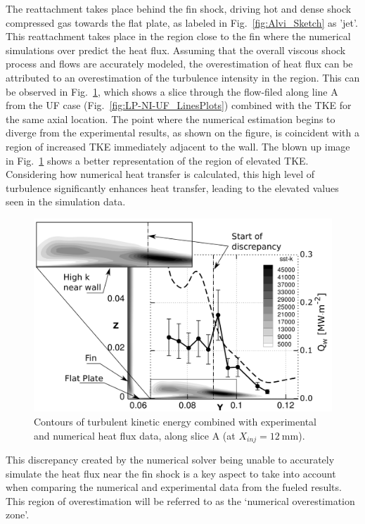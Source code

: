 \documentclass{AIAA}
\begin{document}
The reattachment takes place behind the fin shock, driving hot and dense shock compressed gas towards the flat plate, as labeled in Fig.~\ref{fig:Alvi_Sketch} as 'jet'.
This reattachment takes place in the region close to the fin where the numerical simulations over predict the heat flux.
Assuming that the overall viscous shock process and flows are accurately modeled, the overestimation of heat flux can be attributed to an overestimation of the turbulence intensity in the region.
This can be observed in Fig.~\ref{fig:SSTk_Q_Combi}, which shows a slice through the flow-filed along line A from the UF case (Fig.~\ref{fig:LP-NI-UF_LinesPlots}) combined with the TKE for the same axial location.
The point where the numerical estimation begins to diverge from the experimental results, as shown on the figure, is coincident with a region of increased TKE immediately adjacent to the wall.
The blown up image in Fig.~\ref{fig:SSTk_Q_Combi} shows a better representation of the region of elevated TKE.
Considering how numerical heat transfer is calculated, this high level of turbulence significantly enhances heat transfer, leading to the elevated values seen in the simulation data.

%
\begin{figure}[!h]
\center
\includegraphics[width=0.70\columnwidth,valign=t]{Figures/SST-K_X137_LP_NI_UF_Q_and_SSTk_Combined.pdf}
\caption{Contours of turbulent kinetic energy combined with experimental and numerical heat flux data, along slice A (at $X_{inj} = \SI{12}{\milli\meter}$).}
\label{fig:SSTk_Q_Combi}
\end{figure} 


This discrepancy created by the numerical solver being unable to accurately simulate the heat flux near the fin shock is a key aspect to take into account when comparing the numerical and experimental data from the fueled results. 
This region of overestimation will be referred to as the `numerical overestimation zone'.
\end{document}
